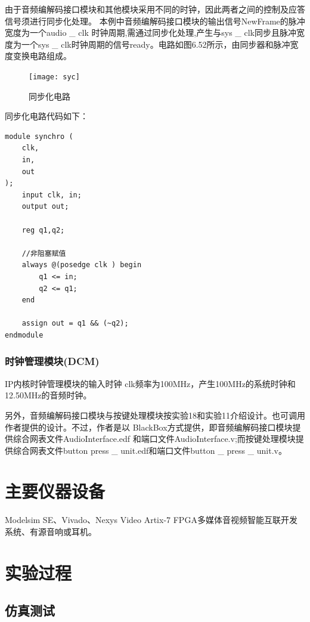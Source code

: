 \documentclass{../source/Experiment}
\begin{document}
                由于音频编解码接口模块和其他模块采用不同的时钟，因此两者之间的控制及应答信号须进行同步化处理。
                本例中音频编解码接口模块的输出信号NewFrame的脉冲宽度为一个audio \_ clk 时钟周期,需通过同步化处理,产生与sys \_ clk同步且脉冲宽度为一个sys \_ clk时钟周期的信号ready。电路如图6.52所示，由同步器和脉冲宽度变换电路组成。

                \begin{figure}[H]
                    \centering
                    \texttt{[image: syc]}
                    \caption{同步化电路}
                \end{figure}

                同步化电路代码如下：
                \begin{lstlisting}[name = 同步化电路代码]
module synchro (
    clk,
    in,
    out
);
    input clk, in;
    output out;

    reg q1,q2;

    //非阻塞赋值
    always @(posedge clk ) begin
        q1 <= in;
        q2 <= q1;
    end

    assign out = q1 && (~q2);
endmodule
                \end{lstlisting}
            \subsubsection{时钟管理模块(DCM)}
        
                IP内核时钟管理模块的输入时钟 clk频率为100MHz，产生100MHz的系统时钟和12.50MHz的音频时钟。
                
                另外，音频编解码接口模块与按键处理模块按实验18和实验11介绍设计。也可调用作者提供的设计。不过，作者是以 BlackBox方式提供，即音频编解码接口模块提供综合网表文件AudioInterface.edf 和端口文件AudioInterface.v;而按键处理模块提供综合网表文件button press \_ unit.edf和端口文件button \_ press \_ unit.v。

    \section{主要仪器设备}
    Modelsim SE、Vivado、Nexys Video Artix-7 FPGA多媒体音视频智能互联开发系统、有源音响或耳机。
    \section{实验过程}
        \subsection{仿真测试}
\end{document}
